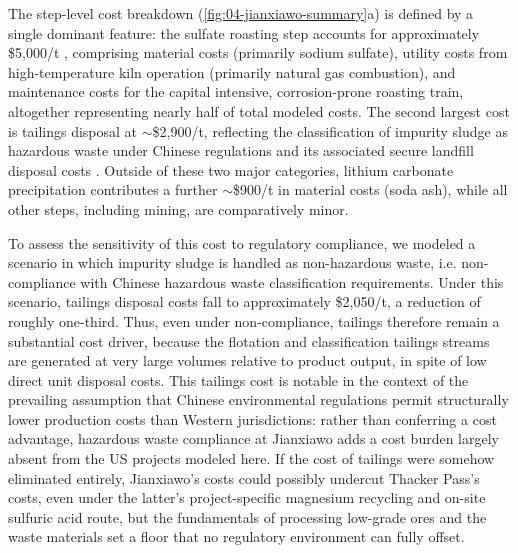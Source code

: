The step-level cost breakdown (\ref{fig:04-jianxiawo-summary}a) is defined by a single dominant feature: the sulfate roasting step accounts for approximately \$5,000/t , comprising material costs (primarily sodium sulfate), utility costs from high-temperature kiln operation (primarily natural gas combustion), and maintenance costs for the capital intensive, corrosion-prone roasting train, altogether representing nearly half of total modeled costs. The second largest cost is tailings disposal at $\sim$\$2,900/t, reflecting the classification of impurity sludge as hazardous waste under Chinese regulations and its associated secure landfill disposal costs \cite{nationaldevelopmentandreformcommission2024}. Outside of these two major categories, lithium carbonate precipitation contributes a further $\sim$\$900/t in material costs (soda ash), while all other steps, including mining, are comparatively minor. 

To assess the sensitivity of this cost to regulatory compliance, we modeled a scenario in which impurity sludge is handled as non-hazardous waste, i.e. non-compliance with Chinese hazardous waste classification requirements. Under this scenario, tailings disposal costs fall to approximately \$2,050/t, a reduction of roughly one-third. Thus, even under non-compliance, tailings therefore remain a substantial cost driver, because the flotation and classification tailings streams are generated at very large volumes relative to product output, in spite of low direct unit disposal costs. This tailings cost is notable in the context of the prevailing assumption that Chinese environmental regulations permit structurally lower production costs than Western jurisdictions: rather than conferring a cost advantage, hazardous waste compliance at Jianxiawo adds a cost burden largely absent from the US projects modeled here. If the cost of tailings were somehow eliminated entirely, Jianxiawo's costs could possibly undercut Thacker Pass's costs, even under the latter's project-specific magnesium recycling and on-site sulfuric acid route, but the fundamentals of processing low-grade ores and the waste materials set a floor that no regulatory environment can fully offset. 

